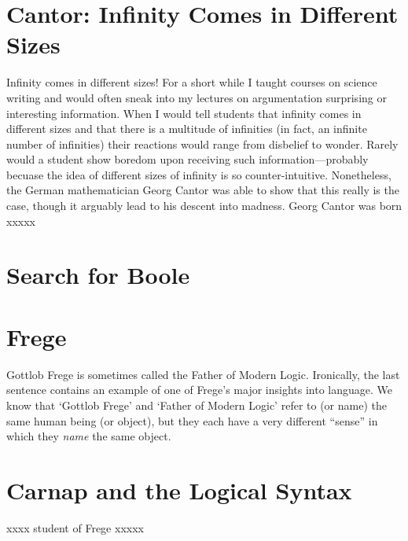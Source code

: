 \section{Cantor: Infinity Comes in Different Sizes}
Infinity comes in different sizes! For a short while I taught courses on science writing and would often sneak into my lectures on argumentation surprising or interesting information. When I would tell students that infinity comes in different sizes and that there is a multitude of infinities (in fact, an infinite number of infinities) their reactions would range from disbelief to wonder. Rarely would a student show boredom upon receiving such information---probably becuase the idea of different sizes of infinity is so counter-intuitive. Nonetheless, the German mathematician Georg Cantor was able to show that this really is the case, though it arguably lead to his descent into madness.
Georg Cantor was born xxxxx

\section{Search for Boole}

\section{Frege}
Gottlob Frege is sometimes called the Father of Modern Logic. Ironically, the last sentence contains an example of one of Frege's major insights into language. We know that `Gottlob Frege' and `Father of Modern Logic' refer to (or name) the same human being (or object), but they each have a very different ``sense'' in which they \textsl{name} the same object.

\section{Carnap and the Logical Syntax}
xxxx student of Frege xxxxx

